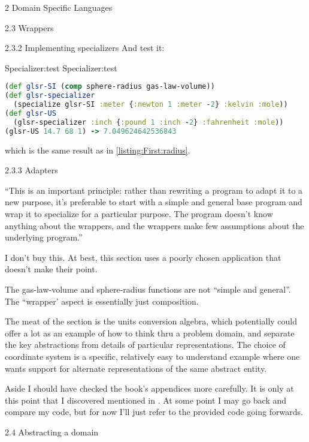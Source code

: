 \documentclass[12pt]{PalisadesLakesBook}
\begin{document}
\begin{plSection}{}
\begin{plSection}{2 Domain Specific Languages}
\begin{plSection}{2.3 Wrappers}
\begin{plSection}{2.3.2 Implementing specializers}
And test it:
\begin{plListing}
{Specializer:test}
{Specializer:test}
\begin{lstlisting}[language=clojure]
(def glsr-SI (comp sphere-radius gas-law-volume))
(def glsr-specializer 
  (specialize glsr-SI :meter {:newton 1 :meter -2} :kelvin :mole))
(def glsr-US 
  (glsr-specializer :inch {:pound 1 :inch -2} :fahrenheit :mole))
(glsr-US 14.7 68 1) -> 7.049624642536843
\end{lstlisting}
\end{plListing}
which is the same result as in \cref{listing:First:radius}.

\end{plSection}%
\begin{plSection}{2.3.3 Adapters}

``This is an important principle:
rather than rewriting a program to adapt it to a new purpose,
it's preferable to start with a simple and general base program
and wrap it to specialize for a particular purpose.
The program doesn't know anything about the wrappers,
and the wrappers make few assumptions about the underlying 
program.''

I don't buy this.
At best, this section uses a poorly chosen application
that doesn't make their point.

The {\clojureFont gas-law-volume} and {\clojureFont sphere-radius}
functions are not ``simple and general''.
The ``wrapper' aspect is essentially just composition.

The meat of the section is the units conversion algebra,
which potentially could offer a lot as an example of how
to think thru a problem domain,
and separate the key abstractions 
from details of particular representations.
The choice of coordinate system is a specific, relatively easy
to understand example where one wants support for alternate 
representations of the same abstract entity.

\end{plSection}%
\end{plSection}%
\begin{plSection}{Aside}
\NOTE 
I should have checked the book's appendices more carefully.
It is only at this point that I discovered
mentioned in 
.
At some point I may go back and compare my code, 
but for now I'll just refer to the provided code going forwards.
\end{plSection}%
\begin{plSection}{2.4 Abstracting a domain}


\end{plSection}
\end{plSection}
\end{plSection}
\end{document}
